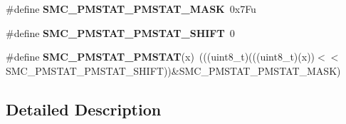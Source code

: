 \begin{DoxyCompactItemize}
\item 
\mbox{\label{group___s_m_c___register___masks_ga2574f973caed7a43c1d0b69888866f63}} 
\#define {\bfseries S\+M\+C\+\_\+\+P\+M\+S\+T\+A\+T\+\_\+\+P\+M\+S\+T\+A\+T\+\_\+\+M\+A\+SK}~0x7\+Fu
\item 
\mbox{\label{group___s_m_c___register___masks_gaa4083ab43677e6a1b6832f6607a5ef0e}} 
\#define {\bfseries S\+M\+C\+\_\+\+P\+M\+S\+T\+A\+T\+\_\+\+P\+M\+S\+T\+A\+T\+\_\+\+S\+H\+I\+FT}~0
\item 
\mbox{\label{group___s_m_c___register___masks_ga27d1d3c05772950ce55e5ad4d2a998e3}} 
\#define {\bfseries S\+M\+C\+\_\+\+P\+M\+S\+T\+A\+T\+\_\+\+P\+M\+S\+T\+AT}(x)~(((uint8\+\_\+t)(((uint8\+\_\+t)(x))$<$$<$S\+M\+C\+\_\+\+P\+M\+S\+T\+A\+T\+\_\+\+P\+M\+S\+T\+A\+T\+\_\+\+S\+H\+I\+FT))\&S\+M\+C\+\_\+\+P\+M\+S\+T\+A\+T\+\_\+\+P\+M\+S\+T\+A\+T\+\_\+\+M\+A\+SK)
\end{DoxyCompactItemize}


\subsection{Detailed Description}
